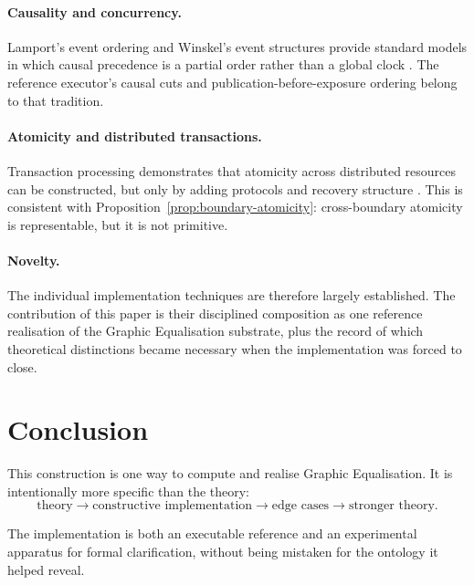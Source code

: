 \documentclass[11pt,a4paper]{article}
\theoremstyle{remark}
\begin{document}
\paragraph{Causality and concurrency.}
Lamport's event ordering and Winskel's event structures provide standard models in which causal precedence is a partial order rather than a global clock \citep{lamport1978,winskel1987}. The reference executor's causal cuts and publication-before-exposure ordering belong to that tradition.

\paragraph{Atomicity and distributed transactions.}
Transaction processing demonstrates that atomicity across distributed resources can be constructed, but only by adding protocols and recovery structure \citep{gray1993}. This is consistent with Proposition~\ref{prop:boundary-atomicity}: cross-boundary atomicity is representable, but it is not primitive.

\paragraph{Novelty.}
The individual implementation techniques are therefore largely established. The contribution of this paper is their disciplined composition as one reference realisation of the Graphic Equalisation substrate, plus the record of which theoretical distinctions became necessary when the implementation was forced to close.

\section{Conclusion}\label{sec:conclusion}

This construction is one way to compute and realise Graphic Equalisation. It is intentionally more specific than the theory:
\[
\boxed{
\text{theory}
\rightarrow
\text{constructive implementation}
\rightarrow
\text{edge cases}
\rightarrow
\text{stronger theory}.
}
\]

The implementation is both an executable reference and an experimental apparatus for formal clarification, without being mistaken for the ontology it helped reveal.
\end{document}
